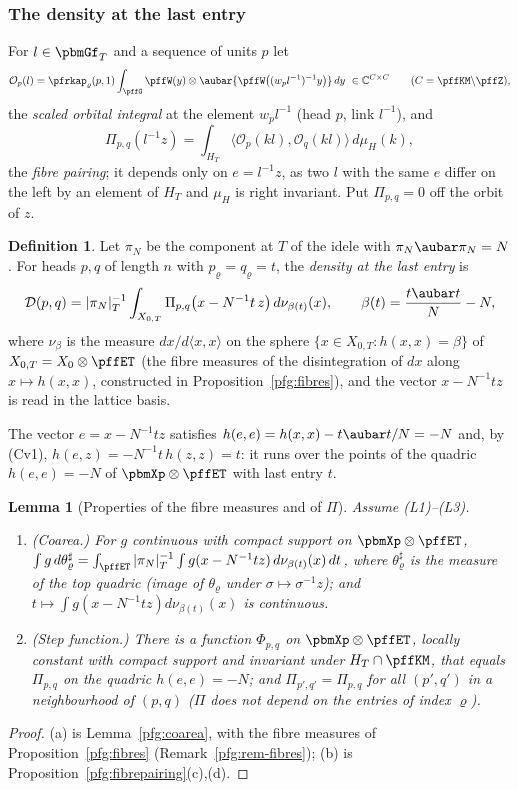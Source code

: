 \documentclass[10pt]{amsart}
\newtheorem{lemma}[theorem]{Lemma}
\theoremstyle{definition}
\newtheorem{definition}[theorem]{Definition}
\theoremstyle{remark}
\newcommand{\C}{\mathbb C}
\begin{document}
\subsubsection*{The density at the last entry}
For $l\in\pbmGf_T$ and a sequence of units $p$ let
\[
\mathcal O_p(l)=\pfrkap_\varrho(p,1)\int_{\pffG}\pffW(y)\otimes\aubar{\pffW\bigl((w_pl^{-1})^{-1}y\bigr)}
\,dy\ \in\C^{C\times C}\qquad(C=\pffKM\backslash\pffZ),
\]
the \emph{scaled orbital integral} at the element $w_pl^{-1}$ (head $p$, link $l^{-1}$), and
\[
\Pi_{p,q}(l^{-1}z)=\int_{H_T}\langle\mathcal O_p(kl),\mathcal O_q(kl)\rangle\,d\mu_H(k),
\]
the \emph{fibre pairing}; it depends only on $e=l^{-1}z$, as two $l$ with the same $e$ differ on the left
by an element of $H_T$ and $\mu_H$ is right invariant. Put $\Pi_{p,q}=0$ off the orbit of $z$.

\begin{definition}\label{pff:lastentry}
Let $\pi_N$ be the component at $T$ of the idele with $\pi_N\aubar\pi_N=N$. For heads $p,q$ of length
$n$ with $p_\varrho=q_\varrho=t$, the \emph{density at the last entry} is
\[
\mathcal D(p,q)=|\pi_N|_T^{-1}\int_{X_{0,T}}\Pi_{p,q}\bigl(x-N^{-1}t\,z\bigr)\,d\nu_{\beta(t)}(x),
\qquad\beta(t)=\frac{t\aubar t}N-N,
\]
where $\nu_\beta$ is the measure $dx/d\langle x,x\rangle$ on the sphere $\{x\in X_{0,T}:h(x,x)=\beta\}$ of
$X_{0,T}=X_0\otimes\pffET$ (the fibre measures of the disintegration of $dx$ along $x\mapsto h(x,x)$, constructed in Proposition~\ref{pfg:fibres}),
and the vector $x-N^{-1}tz$ is read in the lattice basis.
\end{definition}

The vector $e=x-N^{-1}tz$ satisfies $h(e,e)=h(x,x)-t\aubar t/N=-N$ and, by (Cv1), $h(e,z)=-N^{-1}t\,h(z,z)=t$: it runs over the
points of the quadric $h(e,e)=-N$ of $\pbmXp\otimes\pffET$ with last entry $t$.

\begin{lemma}[Properties of the fibre measures and of $\Pi$]\label{pff:fibre}
Assume (L1)--(L3).
\begin{enumerate}
\item[(a)] (\emph{Coarea.}) For $g$ continuous with compact support on $\pbmXp\otimes\pffET$,
$\int g\,d\theta_\varrho^{\sharp}=\int_{\pffET}|\pi_N|_T^{-1}\int g(x-N^{-1}tz)\,d\nu_{\beta(t)}(x)\,dt$, where
$\theta_\varrho^\sharp$ is the measure of the top quadric (image of $\theta_\varrho$ under $\sigma\mapsto
\sigma^{-1}z$); and $t\mapsto\int g(x-N^{-1}tz)d\nu_{\beta(t)}(x)$ is continuous.
\item[(b)] (\emph{Step function.}) There is a function $\Phi_{p,q}$ on $\pbmXp\otimes\pffET$, locally constant with
compact support and invariant under $H_T\cap\pffKM$, that equals $\Pi_{p,q}$ on the quadric $h(e,e)=-N$; and
$\Pi_{p',q'}=\Pi_{p,q}$ for all $(p',q')$ in a neighbourhood of $(p,q)$ ($\Pi$ does not depend on the entries of
index $\varrho$).
\end{enumerate}
\end{lemma}
\begin{proof}
(a) is Lemma~\ref{pfg:coarea}, with the fibre measures of Proposition~\ref{pfg:fibres} (Remark~\ref{pfg:rem-fibres});
(b) is Proposition~\ref{pfg:fibrepairing}(c),(d).
\end{proof}
\end{document}
